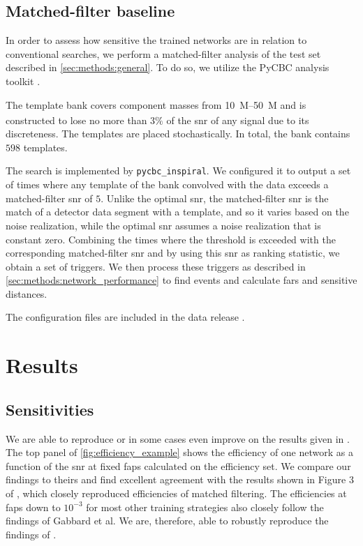 \subsection{Matched-filter baseline}\label{sec:methods:mf}
In order to assess how sensitive the trained networks are in relation to conventional searches, we perform a matched-filter analysis of the test set described in \autoref{sec:methods:general}. To do so, we utilize the PyCBC analysis toolkit \cite{pycbc-github}.

The template bank covers component masses from \SIrange{10}{50}{M_\odot} and is constructed to lose no more than $3\%$ of the \acrshort{snr} of any signal due to its discreteness. The templates are placed stochastically. In total, the bank contains $598$ templates.

The search is implemented by \verb|pycbc_inspiral|. We configured it to output a set of times where any template of the bank convolved with the data exceeds a matched-filter \acrshort{snr} of $5$. Unlike the optimal \acrshort{snr}, the matched-filter \acrshort{snr} is the match of a detector data segment with a template, and so it varies based on the noise realization, while the optimal \acrshort{snr} assumes a noise realization that is constant zero. Combining the times where the threshold is exceeded with the corresponding matched-filter \acrshort{snr} and by using this \acrshort{snr} as ranking statistic, we obtain a set of triggers. We then process these triggers as described in \autoref{sec:methods:network_performance} to find events and calculate \acrshort{far}s and sensitive distances.

The configuration files are included in the data release \cite{ml-training-strategies-github}.

\section{Results}\label{sec:train_strat_results}
\subsection{Sensitivities}\label{sec:results:sensitivities}
We are able to reproduce or in some cases even improve on the results given in \cite{Gabbard:2017lja}. The top panel of \autoref{fig:efficiency_example} shows the efficiency of one network as a function of the \acrshort{snr} at fixed \acrshort{fap}s calculated on the efficiency set. We compare our findings to theirs and find excellent agreement with the results shown in Figure 3 of \cite{Gabbard:2017lja}, which closely reproduced efficiencies of matched filtering. The efficiencies at \acrshort{fap}s down to $10^{-3}$ for most other training strategies also closely follow the findings of Gabbard et al. We are, therefore, able to robustly reproduce the findings of \cite{Gabbard:2017lja}.

